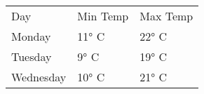 \begin{tabular}{ l l l }
  Day       & Min Temp & Max Temp \\
  Monday    &    11° C &  22° C \\
  Tuesday   &     9° C &  19° C \\
  Wednesday &    10° C &  21° C \\
\end{tabular}
